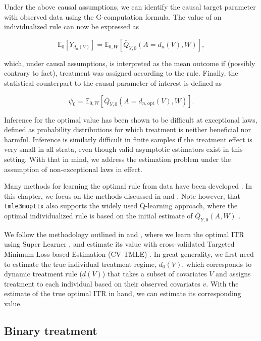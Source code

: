 \documentclass[
  12pt, krantz2,
]{krantz}
\newcommand{\passthrough}[1]{#1}
\theoremstyle{definition}
\theoremstyle{definition}
\theoremstyle{definition}
\newcommand{\E}{\mathbb{E}}
\newcommand{\1}{\mathbbm{1}}
\begin{document}
Under the above causal assumptions, we can identify the causal target parameter
with observed data using the G-computation formula. The value of an individualized
rule can now be expressed as

\[\E_0[Y_{d_n(V)}] = \E_{0,W}[\bar{Q}_{Y,0}(A=d_n(V),W)],\]

which, under causal assumptions, is interpreted as the mean outcome if
(possibly contrary to fact), treatment was assigned according to the rule.
Finally, the statistical counterpart to the causal parameter of interest is
defined as

\[\psi_0 = \E_{0,W}[\bar{Q}_{Y,0}(A=d_{n,\text{opt}}(V),W)].\]

Inference for the optimal value has been shown to be difficult at exceptional
laws, defined as probability distributions for which treatment is neither
beneficial nor harmful. Inference is similarly difficult in finite samples if
the treatment effect is very small in all strata, even though valid asymptotic
estimators exist in this setting. With that in mind, we address the estimation
problem under the assumption of non-exceptional laws in effect.

Many methods for learning the optimal rule from data have been developed
\citep{murphy2003, robins2004, laber2012, kosorok2012, moodie2013}. In this
chapter, we focus on the methods discussed in \citet{luedtke2016super} and
\citet{vanderLaanLuedtke15}. Note however, that \passthrough{\lstinline!tmle3mopttx!} also supports the widely
used Q-learning approach, where the optimal individualized rule is based on the
initial estimate of \(\bar{Q}_{Y,0}(A,W)\) \citep{Sutton1998}.

We follow the methodology outlined in \citet{luedtke2016super} and
\citet{vanderLaanLuedtke15}, where we learn the optimal ITR using Super Learner
\citep{vdl2007super}, and estimate its value with cross-validated Targeted Minimum
Loss-based Estimation (CV-TMLE) \citep{cvtmle2010}. In great generality, we first
need to estimate the true individual treatment regime, \(d_0(V)\), which
corresponds to dynamic treatment rule (\(d(V)\)) that takes a subset of covariates
\(V\) and assigns treatment to each individual based on their observed
covariates \(v\). With the estimate of the true optimal ITR in hand, we can
estimate its corresponding value.

\hypertarget{binary-treatment}{%
\subsection{Binary treatment}\label{binary-treatment}}
\end{document}
